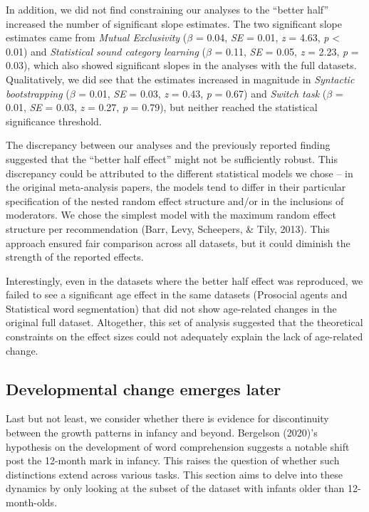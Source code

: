\documentclass[
  man]{apa6}
\begin{document}
In addition, we did not find constraining our analyses to the ``better half'' increased the number of significant slope estimates. The two significant slope estimates came from \emph{Mutual Exclusivity} (\(\beta\) = 0.04, \emph{SE} = 0.01, \emph{z} = 4.63, \emph{p} \textless{} 0.01) and \emph{Statistical sound category learning} (\(\beta\) = 0.11, \emph{SE} = 0.05, \emph{z} = 2.23, \emph{p} = 0.03), which also showed significant slopes in the analyses with the full datasets. Qualitatively, we did see that the estimates increased in magnitude in \emph{Syntactic bootstrapping} (\(\beta\) = 0.01, \emph{SE} = 0.03, \emph{z} = 0.43, \emph{p} = 0.67) and \emph{Switch task} (\(\beta\) = 0.01, \emph{SE} = 0.03, \emph{z} = 0.27, \emph{p} = 0.79), but neither reached the statistical significance threshold.

The discrepancy between our analyses and the previously reported finding suggested that the ``better half effect'' might not be sufficiently robust. This discrepancy could be attributed to the different statistical models we chose -- in the original meta-analysis papers, the models tend to differ in their particular specification of the nested random effect structure and/or in the inclusions of moderators. We chose the simplest model with the maximum random effect structure per recommendation (Barr, Levy, Scheepers, \& Tily, 2013). This approach ensured fair comparison across all datasets, but it could diminish the strength of the reported effects.

Interestingly, even in the datasets where the better half effect was reproduced, we failed to see a significant age effect in the same datasets (Prosocial agents and Statistical word segmentation) that did not show age-related changes in the original full dataset. Altogether, this set of analysis suggested that the theoretical constraints on the effect sizes could not adequately explain the lack of age-related change.

\hypertarget{developmental-change-emerges-later}{%
\subsection{Developmental change emerges later}\label{developmental-change-emerges-later}}

Last but not least, we consider whether there is evidence for discontinuity between the growth patterns in infancy and beyond. Bergelson (2020)'s hypothesis on the development of word comprehension suggests a notable shift post the 12-month mark in infancy. This raises the question of whether such distinctions extend across various tasks. This section aims to delve into these dynamics by only looking at the subset of the dataset with infants older than 12-month-olds.
\end{document}
